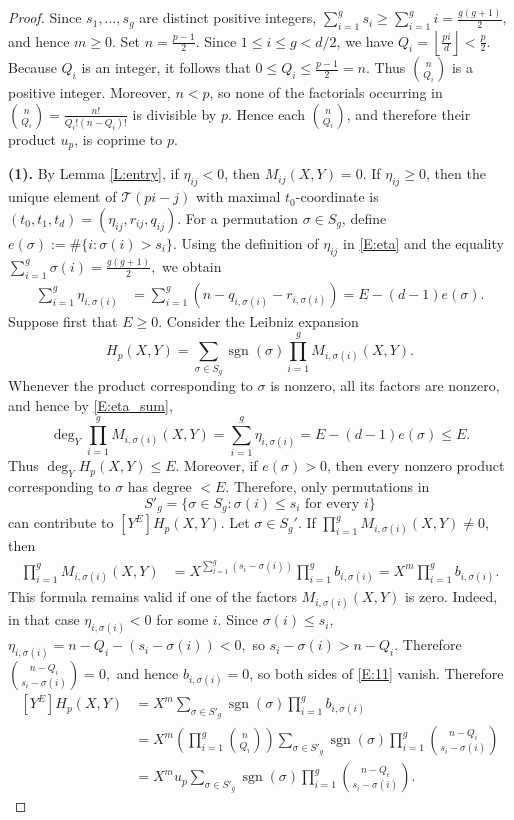 \documentclass{amsart}
\theoremstyle{plain}
\theoremstyle{remark}
\theoremstyle{remark}
\newcommand{\cT}{\mathcal{T}}
\DeclareMathOperator{\sgn}{sgn}
\newcommand{\0}{\mathbf{0}}
\newcommand{\1}{\mathbf{1}}
\begin{document}
\begin{proof}
Since $s_1,\ldots,s_g$ are distinct positive integers, 
$
\sum_{i=1}^{g}s_i\geq \sum_{i=1}^{g}i=\frac{g(g+1)}2,
$
and hence $m\geq0$.
Set
$
n=\frac{p-1}{2}.
$
Since $1\leq i\leq g<d/2$, we have
$
Q_i=\left\lfloor\frac{pi}{d}\right\rfloor<\frac p2.
$
Because $Q_i$ is an integer, it follows that
$
0\leq Q_i\leq \frac{p-1}{2}=n.
$
Thus $\binom{n}{Q_i}$ is a positive integer. Moreover, $n<p$, so none of the factorials occurring in
$
\binom{n}{Q_i}=\frac{n!}{Q_i!(n-Q_i)!}
$
is divisible by $p$. Hence each 
$\binom{n}{Q_i}$, and therefore their product $u_p$, is coprime to $p$.

\noindent
{\bf(1).} 
By Lemma \ref{L:entry}, if $\eta_{ij}<0$, then  $M_{ij}(X,Y)=0$.
If $\eta_{ij}\ge 0$, then the unique element of $\cT(pi-j)$ with maximal
$t_0$-coordinate is 
$(t_0,t_1,t_d)=(\eta_{ij},r_{ij},q_{ij})$.
For a permutation $\sigma\in S_g$, define
$
e(\sigma):=\#\{i:\sigma(i)>s_i\}.
$
Using the definition of $\eta_{ij}$ in \eqref{E:eta} and the equality
$
\sum_{i=1}^{g}\sigma(i)=\frac{g(g+1)}2,
$
we obtain
\begin{align}\label{E:eta_sum}
\sum_{i=1}^{g}\eta_{i,\sigma(i)}
&=
\sum_{i=1}^{g}
\left(
n-q_{i,\sigma(i)}-r_{i,\sigma(i)}\right)=
E-(d-1)e(\sigma).
\end{align}
Suppose first that $E\ge 0$. Consider the Leibniz expansion
$$
H_p(X,Y)=\sum_{\sigma\in S_g}\sgn(\sigma)\prod_{i=1}^g M_{i,\sigma(i)}(X,Y).
$$
Whenever the product corresponding to $\sigma$ is nonzero, all its
factors are nonzero, and hence by \eqref{E:eta_sum},
$$
\deg_Y\prod_{i=1}^g M_{i,\sigma(i)}(X,Y)=
\sum_{i=1}^{g}\eta_{i,\sigma(i)}
=E-(d-1)e(\sigma)\leq E.
$$
Thus $\deg_YH_p(X,Y)\le E$.
Moreover, if $e(\sigma)>0$, then every nonzero product corresponding to $\sigma$ has degree $<E$. Therefore, only permutations in 
$$
S'_g=\{\sigma\in S_g: \sigma(i)\leq s_i\text{ for every $i$}\}
$$
can contribute to $[Y^E]H_p(X,Y)$.
Let $\sigma\in S_g'$. 
If $\prod_{i=1}^g M_{i,\sigma(i)}(X,Y)\ne 0$, 
then 
\begin{align}
[Y^E]\prod_{i=1}^{g} M_{i,\sigma(i)}(X,Y)
&=X^{\sum_{i=1}^g (s_i-\sigma(i))} \prod_{i=1}^gb_{i,\sigma(i)}
=X^m \prod_{i=1}^g b_{i,\sigma(i)}.
\label{E:11}
\end{align}
This formula remains valid if one of the factors 
$M_{i,\sigma(i)}(X,Y)
$
is zero. Indeed, in that case $\eta_{i,\sigma(i)}<0$ for some $i$.
Since $\sigma(i)\le s_i$,
$
\eta_{i,\sigma(i)}=n-Q_i-(s_i-\sigma(i))<0,
$
so
$
s_i-\sigma(i)>n-Q_i.
$
Therefore
$
\binom{n-Q_i}{s_i-\sigma(i)}=0,
$
and hence $b_{i,\sigma(i)}=0$, 
so both sides of \eqref{E:11} vanish.
Therefore
\begin{align}\label{E:12}
[Y^E]H_p(X,Y)
&=X^m\sum_{\sigma\in S'_g}\sgn(\sigma)\prod_{i=1}^{g}b_{i,\sigma(i)}
\\
&=X^m\left(
\prod_{i=1}^{g}\binom{n}{Q_i}
\right)
\sum_{\sigma\in S'_g}
\sgn(\sigma)
\prod_{i=1}^{g}
\binom{n-Q_i}{s_i-\sigma(i)} \nonumber\\
&=X^m u_p \sum_{\sigma\in S'_g}\sgn(\sigma)\prod_{i=1}^{g}
\binom{n-Q_i}{s_i-\sigma(i)}. \nonumber
\end{align}


\end{proof}
\end{document}
